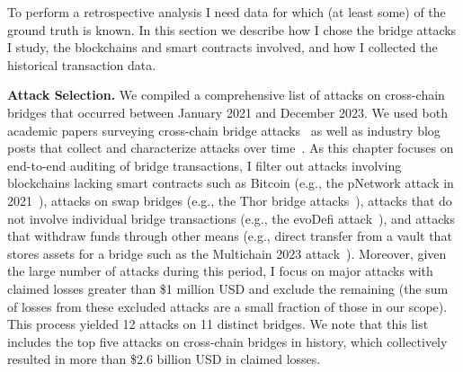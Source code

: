 
To perform a retrospective analysis I need data for which (at
least some) of the ground truth is known.   In this section we
describe how I chose the bridge attacks I study, the blockchains and
smart contracts involved, and how I collected the historical
transaction data.

\textbf{Attack Selection.}
%
We compiled a comprehensive list of attacks on cross-chain
bridges that occurred between January 2021 and December 2023.  We used both academic papers surveying cross-chain
bridge attacks~\cite{lee2023sok, zhang2023sok, zhao2023comprehensive} as well
as industry blog posts that collect and characterize attacks over time~\cite{GithubBridgeBugTracker, SlowMistHackedBridges:online,
  REKTDB:online, Web3Great:online, GithubBridgeHacks2:online}. 
As this chapter focuses on end-to-end auditing of bridge transactions, I filter out attacks
involving blockchains lacking smart contracts such
as Bitcoin (e.g., the pNetwork attack in 2021~\cite{pNetworkhack:online}), attacks on swap bridges (e.g., the Thor bridge attacks~\cite{Thorhack1:online,Thorhack2:online}), attacks that do not involve individual bridge transactions (e.g., the evoDefi attack~\cite{evoDefihack:online}),
and attacks that withdraw funds through other means (e.g., direct transfer from a vault that stores assets for a bridge such as the Multichain 2023 attack~\cite{Multichainhack:online}).  Moreover, given the large number of attacks during this period, I focus on
major attacks with claimed losses greater than \$1 million USD and
exclude the remaining (the sum of losses from these excluded attacks are a small fraction of those in our scope).
%
%
This process yielded 12 attacks on 11 distinct bridges.
We note that this list
includes the top five attacks on cross-chain bridges in history, which
collectively resulted in more than \$2.6 billion USD in claimed losses.

